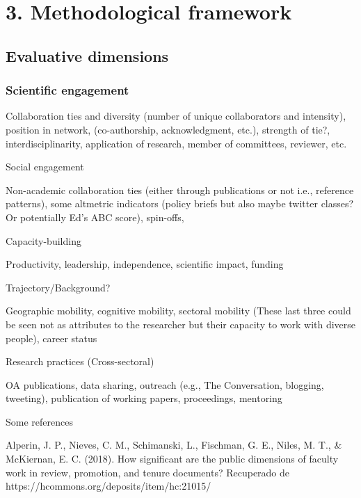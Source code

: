 \documentclass[]{elsarticle} %
\begin{document}
\hypertarget{methodological-framework}{%
\section{3. Methodological framework}\label{methodological-framework}}

\hypertarget{evaluative-dimensions}{%
\subsection{Evaluative dimensions}\label{evaluative-dimensions}}

\hypertarget{scientific-engagement}{%
\subsubsection{Scientific engagement}\label{scientific-engagement}}

Collaboration ties and diversity (number of unique collaborators and
intensity), position in network, (co-authorship, acknowledgment, etc.),
strength of tie?, interdisciplinarity, application of research, member
of committees, reviewer, etc.

Social engagement

Non-academic collaboration ties (either through publications or not
i.e., reference patterns), some altmetric indicators (policy briefs but
also maybe twitter classes? Or potentially Ed's ABC score), spin-offs,

Capacity-building

Productivity, leadership, independence, scientific impact, funding

Trajectory/Background?

Geographic mobility, cognitive mobility, sectoral mobility (These last
three could be seen not as attributes to the researcher but their
capacity to work with diverse people), career status

Research practices (Cross-sectoral)

OA publications, data sharing, outreach (e.g., The Conversation,
blogging, tweeting), publication of working papers, proceedings,
mentoring

Some references

Alperin, J. P., Nieves, C. M., Schimanski, L., Fischman, G. E., Niles,
M. T., \& McKiernan, E. C. (2018). How significant are the public
dimensions of faculty work in review, promotion, and tenure documents?
Recuperado de https://hcommons.org/deposits/item/hc:21015/
\end{document}
